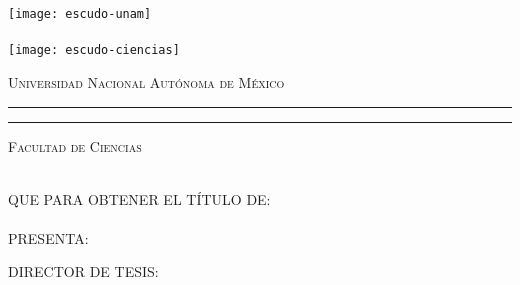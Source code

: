 \hskip-1.5cm
\begin{minipage}[c][10cm][s]{3cm}
  \begin{center}
    \texttt{[image: escudo-unam]}\\[10pt]
    \hskip2pt\vrule width2pt height13cm\hskip1mm
    \vrule width1pt height13cm\\[10pt]
    \texttt{[image: escudo-ciencias]}
  \end{center}
\end{minipage}\quad
%
\begin{minipage}[c][9.5cm][s]{10cm}
  \begin{center}
    {\large \scshape Universidad Nacional Autónoma de México}
    \vspace{.3cm}
    \hrule height2pt
    \vspace{.1cm}
    \hrule height1pt
    \vspace{.3cm}
    {\scshape Facultad de Ciencias}

    \vspace{3cm}

    {\Large \eltitulo}

    \vspace{3cm}

    \\[8pt]
    QUE PARA OBTENER EL TÍTULO DE:\\[3pt]
    \mbox{}\lacarrera\\[13pt]
    PRESENTA:\\[3pt]
    \elnombre

    \vspace{2cm}

    {\small DIRECTOR DE TESIS:\\ \eldirector}

    \vspace{2cm}

    \lafecha

  \end{center}
\end{minipage}
